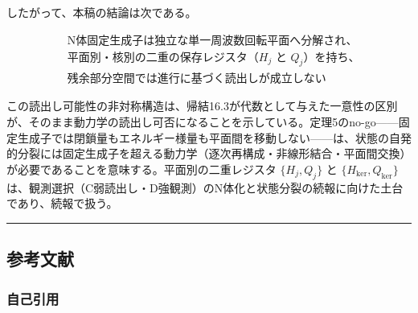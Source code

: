 \documentclass[
  a4paper,
]{ltjsarticle}
\begin{document}
したがって、本稿の結論は次である。

\[
\boxed{
\begin{aligned}
&\text{N体固定生成子は独立な単一周波数回転平面へ分解され、}\\
&\text{平面別・核別の二重の保存レジスタ（}H_j\text{ と }Q_j\text{）を持ち、}\\
&\text{残余部分空間では進行に基づく読出しが成立しない}
\end{aligned}
}
\]

この読出し可能性の非対称構造は、帰結16.3が代数として与えた一意性の区別が、そのまま動力学の読出し可否になることを示している。定理5のno-go------固定生成子では閉鎖量もエネルギー様量も平面間を移動しない------は、状態の自発的分裂には固定生成子を超える動力学（逐次再構成・非線形結合・平面間交換）が必要であることを意味する。平面別の二重レジスタ
\(\{H_j,Q_j\}\) と \(\{H_{\ker},Q_{\ker}\}\)
は、観測選択（C弱読出し・D強観測）のN体化と状態分裂の続報に向けた土台であり、続報で扱う。

\begin{center}\rule{0.5\linewidth}{0.5pt}\end{center}

\subsection{参考文献}\label{ux53c2ux8003ux6587ux732e}

\subsubsection{自己引用}\label{ux81eaux5df1ux5f15ux7528}
\end{document}
